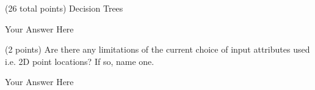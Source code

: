 \documentclass[12pt]{article}
\begin{document}
\begin{question}{(26 total points) Decision Trees}
\begin{subquestion}
\begin{answerbox}{10em}
Your Answer Here
\end{answerbox}



\end{subquestion}



%
%
\begin{subquestion}{(2 points) 
Are there any limitations of the current choice of input attributes used i.e. 2D point locations? If so, name one. 
}


\begin{answerbox}{10em}
Your Answer Here
\end{answerbox}



\end{subquestion}


\end{question}




\clearpage
\end{document}
